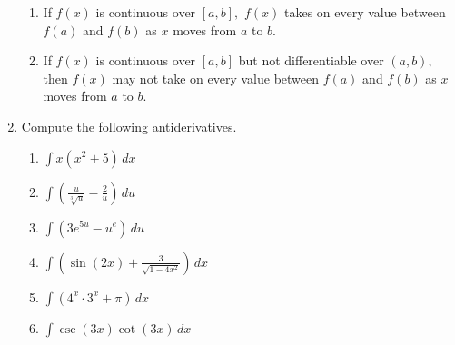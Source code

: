 \documentclass{article}
\newcommand{\vsp}{\vspace{1em}}
\newcommand{\<}{\langle}
\renewcommand{\>}{\rangle}
\begin{document}
\begin{enumerate}
\begin{enumerate}
    \item If $f(x)$ is continuous over $[a,b],$ $f(x)$ takes on every value between $f(a)$ and $f(b)$ as $x$ moves from $a$ to $b$. \vsp
    
    \item If $f(x)$ is continuous over $[a,b]$ but not differentiable over $(a,b),$ then $f(x)$ may not take on every value between
$f(a)$ and $f(b)$ as $x$ moves from $a$ to $b$.
\end{enumerate}
\vsp



\item Compute the following antiderivatives.

\begin{multicols}{3}
    \begin{enumerate}
        \item $\displaystyle \int x(x^2+5) \,dx$\vsp 
        
        \item $\displaystyle \int \left(\frac{u}{\sqrt[3]{u}} - \frac{2}{u} \right)\,du$\vsp 
        
        \item $\displaystyle \int (3e^{5u}-u^e) \,du$\vsp 
        
        
        
        \item $\displaystyle \int \left( \sin(2x)+\frac{3}{\sqrt{1-4x^2}} \right) \,dx$\vsp 
        
        \item $\displaystyle \int (4^x\cdot 3^x+\pi) \,dx$\vsp 
        
        \item $\displaystyle \int \csc(3x)\cot(3x) \,dx$
    \end{enumerate}
\end{multicols} 


\fi
\end{enumerate}
\end{document}
